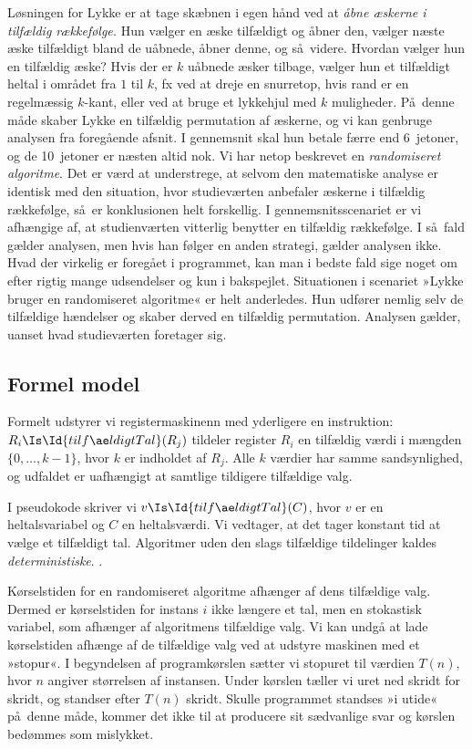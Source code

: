 Løsningen for Lykke er at tage skæbnen i egen hånd ved at \emph{åbne æskerne i tilfældig rækkefølge.}
Hun vælger en æske tilfældigt og åbner den, vælger næste æske tilfældigt bland de uåbnede, åbner denne, og så videre.
Hvordan vælger hun en tilfældig æske?
Hvis der er $k$ uåbnede æsker tilbage, vælger hun et tilfældigt heltal
i området fra $1$ til $k$, fx ved at dreje en snurretop, hvis rand er en regelmæssig $k$-kant, eller ved at bruge et lykkehjul med $k$ muligheder.
På denne måde skaber Lykke en tilfældig permutation af æskerne, og vi kan genbruge analysen fra foregående afsnit.
I gennemsnit skal hun betale færre end 6~jetoner, og de 10~jetoner er næsten altid nok.
Vi har netop beskrevet en \emph{randomiseret algoritme}.
Det er værd at understrege, at selvom den matematiske analyse er identisk med den situation, hvor studieværten anbefaler æskerne i tilfældig rækkefølge, så er konklusionen helt forskellig.
I gennemsnitsscenariet er vi afhængige af, at studienværten vitterlig benytter en tilfældig rækkefølge.
I så fald gælder analysen, men hvis han følger en anden strategi, gælder analysen ikke.
Hvad der virkelig er foregået i programmet, kan man i bedste fald sige noget om efter rigtig mange udsendelser og kun i bakspejlet. 
Situationen i scenariet »Lykke bruger en randomiseret algoritme« er helt anderledes.
Hun udfører nemlig selv de tilfældige hændelser og skaber derved en tilfældig permutation.
Analysen gælder, uanset hvad studieværten foretager sig.

\subsection{Formel model}

Formelt udstyrer vi registermaskinenn med yderligere en instruktion:
$R_i \Is \Id{tilfældigtTal}(R_j)$
tildeler register $R_i$ en tilfældig værdi i mængden $\{0,\ldots,k-1\}$, hvor $k$ er indholdet af $R_j$. 
Alle $k$ værdier har samme sandsynlighed, og udfaldet er uafhængigt at samtlige tildigere tilfældige valg.	
 
I pseudokode skriver vi $v \Is \Id{tilfældigtTal}(C)$, hvor $v$ er en heltalsvariabel og $C$ en heltalsværdi.
Vi vedtager, at det tager konstant tid at vælge et tilfældigt tal.
Algoritmer uden den slags tilfældige tildelinger kaldes
\emph{deterministiske}.
. 

Kørselstiden for en randomiseret algoritme afhænger af dens tilfældige valg.
Dermed er kørselstiden for instans $i$ ikke længere et tal, men en stokastisk variabel, som afhænger af algoritmens tilfældige valg.
Vi kan undgå at lade kørselstiden afhænge af de tilfældige valg ved at udstyre maskinen med et »stopur«.
I begyndelsen af programkørslen sætter vi stopuret til værdien $T(n)$, hvor $n$ angiver størrelsen af instansen.
Under kørslen tæller vi uret ned skridt for skridt, og standser efter $T(n)$ skridt.
Skulle programmet standses »i utide« på denne måde, kommer det ikke til at producere sit sædvanlige svar og kørslen bedømmes som mislykket. 

